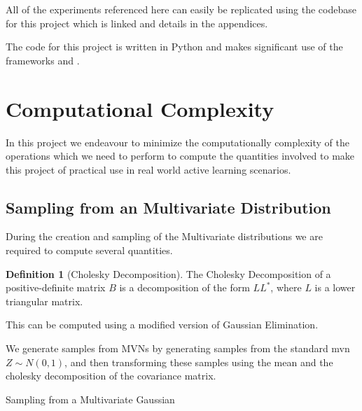 \documentclass[12pt, a4paper]{report}
\theoremstyle{definition}
\theoremstyle{definition}
\newtheorem{definition}{Definition}[section]
\theoremstyle{definition}
\begin{document}
All of the experiments referenced here can easily be replicated using the codebase for this project which is linked and details in the appendices.

The code for this project is written in Python and makes significant use of the frameworks \cite[Pytorch]{NEURIPS2019_9015} and \cite[GPytorch]{gardner2018gpytorch}.





\section{Computational Complexity}
\label{sec:Computation}
In this project we endeavour to minimize the computationally complexity of the operations which we need to perform to compute the quantities involved to make this project of practical use in real world active learning scenarios.


\subsection{Sampling from an Multivariate Distribution}

During the creation and sampling of the Multivariate distributions we are required to compute several quantities.

\begin{definition}[Cholesky Decomposition]
    The Cholesky Decomposition of a positive-definite matrix $B$ is a decomposition of the form $LL^*$, where $L$ is a lower triangular matrix.
\end{definition}

This can be computed using a modified version of Gaussian Elimination.

We generate samples from MVNs by generating samples from the standard mvn $Z \sim N\left(0, 1\right)$, and then transforming these samples using the mean and the cholesky decomposition of the covariance matrix.

\begin{algorithm}[H]
    \SetAlgoLined
    \caption{Sampling from a Multivariate Gaussian}
\end{algorithm}
\end{document}
